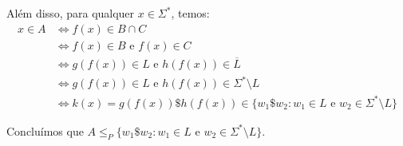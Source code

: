 \documentclass[a4paper,12pt]{article}
\begin{document}
\begin{enumerate}[label=\arabic*)]
  Além disso, para qualquer $x \in \Sigma^*$, temos:
  \begin{align*}
      x \in A &\iff f(x) \in B \cap C \\
      &\iff f(x) \in B \text{ e } f(x) \in C \\
      &\iff g(f(x)) \in L \text{ e } h(f(x)) \in \overline{L} \\
      &\iff g(f(x)) \in L \text{ e } h(f(x)) \in \Sigma^* \setminus L \\
      &\iff k(x) = g(f(x))\$h(f(x)) \in \{w_1\$w_2 : w_1 \in L \text{ e } w_2 \in \Sigma^* \setminus L\}
  \end{align*}

  Concluímos que $A \leq_P \{w_1\$w_2 : w_1 \in L \text{ e } w_2 \in \Sigma^* \setminus L\}$.
\end{enumerate}
\end{document}
